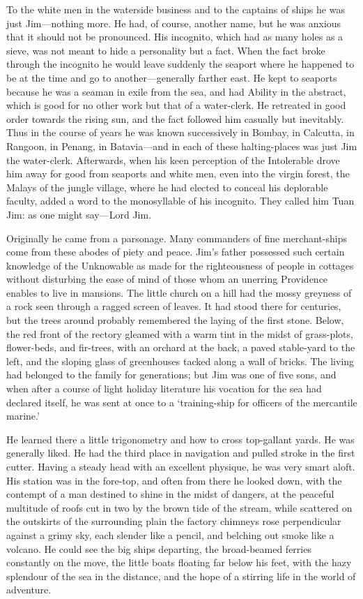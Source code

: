 To the white men in the waterside business and to the captains of ships he was just Jim—nothing more. He had, of course, another name, but he was anxious that it should not be pronounced. His incognito, which had as many holes as a sieve, was not meant to hide a personality but a fact. When the fact broke through the incognito he would leave suddenly the seaport where he happened to be at the time and go to another—generally farther east. He kept to seaports because he was a seaman in exile from the sea, and had Ability in the abstract, which is good for no other work but that of a water-clerk. He retreated in good order towards the rising sun, and the fact followed him casually but inevitably. Thus in the course of years he was known successively in Bombay, in Calcutta, in Rangoon, in Penang, in Batavia—and in each of these halting-places was just Jim the water-clerk. Afterwards, when his keen perception of the Intolerable drove him away for good from seaports and white men, even into the virgin forest, the Malays of the jungle village, where he had elected to conceal his deplorable faculty, added a word to the monosyllable of his incognito. They called him Tuan Jim: as one might say—Lord Jim.

Originally he came from a parsonage. Many commanders of fine merchant-ships come from these abodes of piety and peace. Jim’s father possessed such certain knowledge of the Unknowable as made for the righteousness of people in cottages without disturbing the ease of mind of those whom an unerring Providence enables to live in mansions. The little church on a hill had the mossy greyness of a rock seen through a ragged screen of leaves. It had stood there for centuries, but the trees around probably remembered the laying of the first stone. Below, the red front of the rectory gleamed with a warm tint in the midst of grass-plots, flower-beds, and fir-trees, with an orchard at the back, a paved stable-yard to the left, and the sloping glass of greenhouses tacked along a wall of bricks. The living had belonged to the family for generations; but Jim was one of five sons, and when after a course of light holiday literature his vocation for the sea had declared itself, he was sent at once to a ‘training-ship for officers of the mercantile marine.’

He learned there a little trigonometry and how to cross top-gallant yards. He was generally liked. He had the third place in navigation and pulled stroke in the first cutter. Having a steady head with an excellent physique, he was very smart aloft. His station was in the fore-top, and often from there he looked down, with the contempt of a man destined to shine in the midst of dangers, at the peaceful multitude of roofs cut in two by the brown tide of the stream, while scattered on the outskirts of the surrounding plain the factory chimneys rose perpendicular against a grimy sky, each slender like a pencil, and belching out smoke like a volcano. He could see the big ships departing, the broad-beamed ferries constantly on the move, the little boats floating far below his feet, with the hazy splendour of the sea in the distance, and the hope of a stirring life in the world of adventure.


